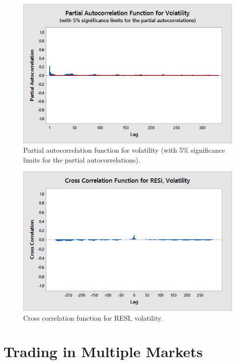         \begin{figure}[!ht]
        \centering
        \includegraphics[width=\textwidth]{chapters/chapter_stat_ts/figures/funvol.png}
        \caption{Partial autocorrelation function for volatility (with 5\% significance limits for the partial autocorrelations). \label{fig:funvol}}
        \end{figure}
        
        \begin{figure}[!ht]
        \centering
        \includegraphics[width=\textwidth]{chapters/chapter_stat_ts/figures/resivol.png}
        \caption{Cross correlation function for RESI, volatility. \label{fig:ccresi}}
        \end{figure}



\section{Trading in Multiple Markets}

